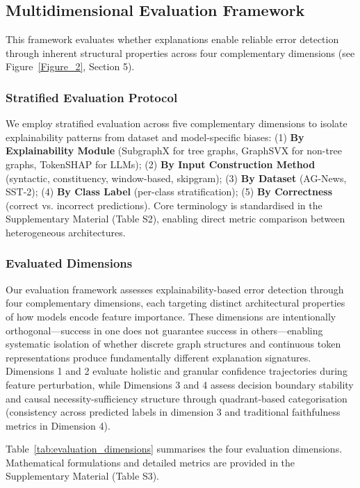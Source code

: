 \documentclass[preprint, times, review, 10pt]{elsarticle}
\begin{document}
\subsection{Multidimensional Evaluation Framework} \label{sec:evaluation_framework}

This framework evaluates whether explanations enable reliable error detection through inherent structural properties across four complementary dimensions (see Figure~\ref{Figure_2}, Section 5).

\subsubsection{Stratified Evaluation Protocol}

We employ stratified evaluation across five complementary dimensions to isolate explainability patterns from dataset and model-specific biases: (1) \textbf{By Explainability Module} (SubgraphX for tree graphs, GraphSVX for non-tree graphs, TokenSHAP for LLMs); (2) \textbf{By Input Construction Method} (syntactic, constituency, window-based, skipgram); (3) \textbf{By Dataset} (AG-News, SST-2); (4) \textbf{By Class Label} (per-class stratification); (5) \textbf{By Correctness} (correct vs. incorrect predictions). Core terminology is standardised in the Supplementary Material (Table S2), enabling direct metric comparison between heterogeneous architectures.

\subsubsection{Evaluated Dimensions}

Our evaluation framework assesses explainability-based error detection through four complementary dimensions, each targeting distinct architectural properties of how models encode feature importance. These dimensions are intentionally orthogonal—success in one does not guarantee success in others—enabling systematic isolation of whether discrete graph structures and continuous token representations produce fundamentally different explanation signatures. Dimensions 1 and 2 evaluate holistic and granular confidence trajectories during feature perturbation, while Dimensions 3 and 4 assess decision boundary stability and causal necessity-sufficiency structure through quadrant-based categorisation (consistency across predicted labels in dimension 3 and traditional faithfulness metrics in Dimension 4).

Table~\ref{tab:evaluation_dimensions} summarises the four evaluation dimensions. Mathematical formulations and detailed metrics are provided in the Supplementary Material (Table S3).
\end{document}
